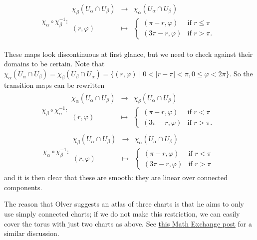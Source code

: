 \documentclass[a4paper]{article}
\begin{document}
\begin{align}
    \chi_\alpha \circ \chi_\beta^{-1} : \begin{array}{rcl} \chi_\beta(U_\alpha \cap U_\beta) & \to & \chi_\alpha(U_\alpha \cap U_\beta) \\ (r, \varphi) & \mapsto & \left\{ \begin{array}{ll} (\pi - r, \varphi) & \text{if } r \leq \pi \\ (3\pi - r, \varphi) & \text{if } r > \pi. \end{array} \right. \end{array}
\end{align}

These maps look discontinuous at first glance, but we need to check against their domains to be certain. Note that $\chi_\alpha(U_\alpha \cap U_\beta) = \chi_\beta(U_\beta \cap U_\alpha) = \{(r, \varphi) \mid 0 < |r - \pi| < \pi, 0 \leq \varphi < 2\pi\}$. So the transition maps can be rewritten
\begin{align}
    \chi_\beta \circ \chi_\alpha^{-1} : \begin{array}{rcl} \chi_\alpha(U_\alpha \cap U_\beta) & \to & \chi_\beta(U_\alpha \cap U_\beta) \\ (r, \varphi) & \mapsto & \left\{ \begin{array}{ll} (\pi - r, \varphi) & \text{if } r < \pi \\ (3\pi - r, \varphi) & \text{if } r > \pi. \end{array} \right. \end{array}
\end{align}
\begin{align}
    \chi_\alpha \circ \chi_\beta^{-1} : \begin{array}{rcl} \chi_\beta(U_\alpha \cap U_\beta) & \to & \chi_\alpha(U_\alpha \cap U_\beta) \\ (r, \varphi) & \mapsto & \left\{ \begin{array}{ll} (\pi - r, \varphi) & \text{if } r < \pi \\ (3\pi - r, \varphi) & \text{if } r > \pi \end{array} \right. \end{array}
\end{align}
and it is then clear that these are smooth: they are linear over connected components.

The reason that Olver suggests an atlas of three charts is that he aims to only use simply connected charts; if we do not make this restriction, we can easily cover the torus with just two charts as above. See \href{https://math.stackexchange.com/a/2898114/921952}{this Math Exchange post} for a similar discussion.
\end{document}
